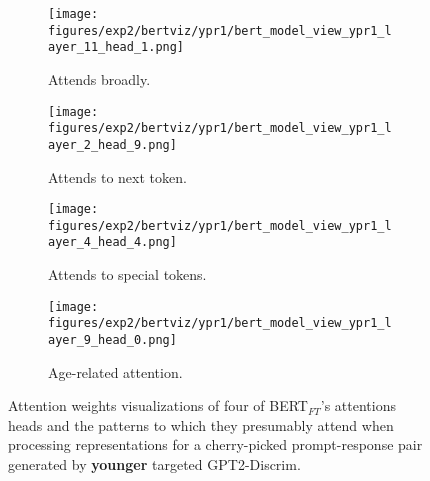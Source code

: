 \begin{figure}[H]
     \centering
     \begin{subfigure}[b]{0.22\textwidth}
        \centering
        \texttt{[image: figures/exp2/bertviz/ypr1/bert\_model\_view\_ypr1\_layer\_11\_head\_1.png]}
        \captionsetup{font=footnotesize,labelfont=footnotesize}
        \caption{Attends broadly.}
        \label{subfig:bertviz_model_view_ypr1_broad}
     \end{subfigure}
     \quad
     \begin{subfigure}[b]{0.22\textwidth}
        \centering
        \texttt{[image: figures/exp2/bertviz/ypr1/bert\_model\_view\_ypr1\_layer\_2\_head\_9.png]}
        \captionsetup{font=footnotesize,labelfont=footnotesize}
        \caption{Attends to next token.}
        \label{subfig:bertviz_model_view_ypr1_next}
     \end{subfigure}
    \quad
    \begin{subfigure}[b]{0.22\textwidth}
        \centering
        \texttt{[image: figures/exp2/bertviz/ypr1/bert\_model\_view\_ypr1\_layer\_4\_head\_4.png]}
        \captionsetup{font=footnotesize,labelfont=footnotesize}
        \caption{Attends to special tokens.}
        \label{subfig:bertviz_model_view_ypr1_special}
     \end{subfigure}
    \quad
     \begin{subfigure}[b]{0.22\textwidth}
        \centering
        \texttt{[image: figures/exp2/bertviz/ypr1/bert\_model\_view\_ypr1\_layer\_9\_head\_0.png]}
        \captionsetup{font=footnotesize,labelfont=footnotesize}
        \caption{Age-related attention.}
        \label{subfig:bertviz_model_view_ypr1_age}
     \end{subfigure}
    \caption{Attention weights visualizations of four of BERT$_{FT}$'s attentions heads and the patterns to which they presumably attend when processing representations for a cherry-picked prompt-response pair generated by \textbf{younger} targeted GPT2-Discrim.}
    \label{fig:bertviz_model_view_ypr1}
\end{figure}


